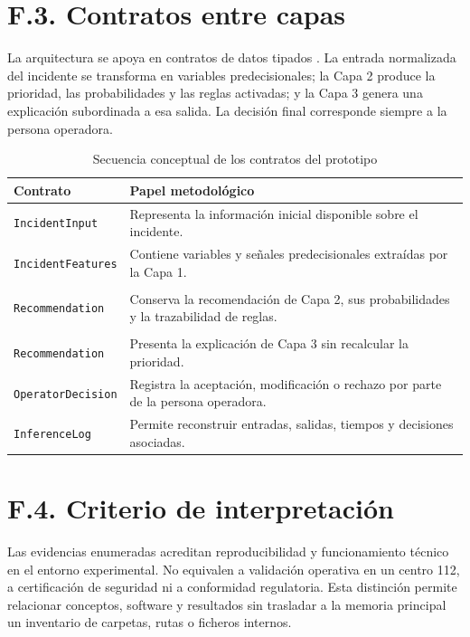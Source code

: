 \clearpage

\section*{F.3. Contratos entre capas}

La arquitectura se apoya en contratos de datos tipados \cite{Pydantic2026}. La entrada
normalizada del incidente se transforma en variables predecisionales; la Capa 2 produce
la prioridad, las probabilidades y las reglas activadas; y la Capa 3 genera una
explicación subordinada a esa salida. La decisión final corresponde siempre a la
persona operadora.

\begin{table}[htbp]
\centering
\caption{Secuencia conceptual de los contratos del prototipo}
\label{tab:anexof-contratos}
\small
\begin{tabularx}{\textwidth}{|p{3.4cm}|X|}
\hline
\textbf{Contrato} & \textbf{Papel metodológico} \\ \hline
\texttt{IncidentInput} & Representa la información inicial disponible sobre el incidente. \\ \hline
\texttt{IncidentFeatures} & Contiene variables y señales predecisionales extraídas por la Capa 1. \\ \hline
\begin{tabular}[t]{@{}l@{}}\texttt{Priority}\\\texttt{Recommendation}\end{tabular} & Conserva la recomendación de Capa 2, sus probabilidades y la trazabilidad de reglas. \\ \hline
\begin{tabular}[t]{@{}l@{}}\texttt{Operator}\\\texttt{Recommendation}\end{tabular} & Presenta la explicación de Capa 3 sin recalcular la prioridad. \\ \hline
\texttt{OperatorDecision} & Registra la aceptación, modificación o rechazo por parte de la persona operadora. \\ \hline
\texttt{InferenceLog} & Permite reconstruir entradas, salidas, tiempos y decisiones asociadas. \\ \hline
\end{tabularx}
\end{table}

\section*{F.4. Criterio de interpretación}

Las evidencias enumeradas acreditan reproducibilidad y funcionamiento técnico en el
entorno experimental. No equivalen a validación operativa en un centro 112, a
certificación de seguridad ni a conformidad regulatoria. Esta distinción permite
relacionar conceptos, software y resultados sin trasladar a la memoria principal un
inventario de carpetas, rutas o ficheros internos.
